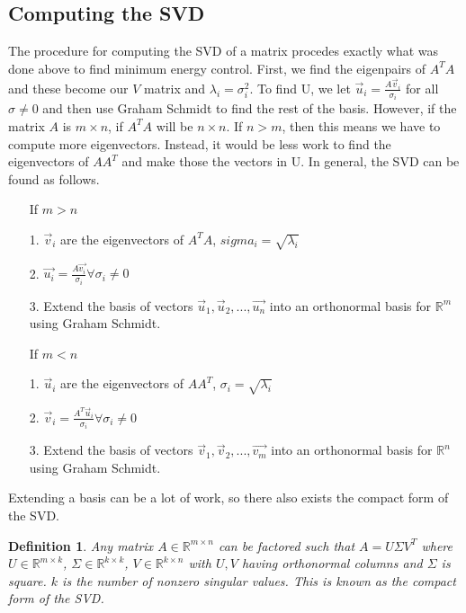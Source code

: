 \documentclass{article}
\newtheorem{definition}{Definition}
\begin{document}
\subsection{Computing the SVD}
The procedure for computing the SVD of a matrix procedes exactly what was done above to find minimum energy control.
First, we find the eigenpairs of $A^TA$ and these become our $V$ matrix and $\lambda_i=\sigma_i^2$. To find U, we let $\vec{u}_i=\frac{A\vec{v}_i}{\sigma_i}$ for all $\sigma \ne 0$ and then use Graham Schmidt to find the rest of the basis.
However, if the matrix $A$ is $m \times n$, if $A^TA$ will be $n \times n$. If $n > m$, then this means we have to compute more eigenvectors. Instead, it would be less work to find the eigenvectors of $AA^T$ and make those the vectors in U.
In general, the SVD can be found as follows.
\begin{itemize}
    \item[] If $m > n$
    \item[1. ] $\vec{v}_i$ are the eigenvectors of $A^TA$, $sigma_i=\sqrt{\lambda_i}$
    \item[2. ] $\vec{u_i}=\frac{A\vec{v_i}}{\sigma_i} \forall \sigma_i \ne 0$
    \item[3. ] Extend the basis of vectors ${\vec{u}_1, \vec{u}_2, ..., \vec{u_n}}$ into an orthonormal basis for $\mathbb{R}^m$ using Graham Schmidt.
    \item[] If $m < n$
    \item[1. ] $\vec{u}_i$ are the eigenvectors of $AA^T$, $\sigma_i=\sqrt{\lambda_i}$
    \item[2. ] $\vec{v}_i=\frac{A^T\vec{u}_i}{\sigma_i} \forall \sigma_i \ne 0$
    \item[3. ] Extend the basis of vectors ${\vec{v}_1, \vec{v}_2, ..., \vec{v_m}}$ into an orthonormal basis for $\mathbb{R}^n$ using Graham Schmidt.
\end{itemize}
Extending a basis can be a lot of work, so there also exists the compact form of the SVD.
\begin{definition}
    Any matrix $A\in \mathbb{R}^{m\times n}$ can be factored such that $A = U\Sigma V^T$
     where $U\in \mathbb{R}^{m\times k}$, $\Sigma \in \mathbb{R}^{k \times k}$, $V\in \mathbb{R}^{k \times n}$
     with $U,V$ having orthonormal columns and $\Sigma$ is square. $k$ is the number of nonzero singular values.
     This is known as the compact form of the SVD.
\end{definition}
\end{document}
